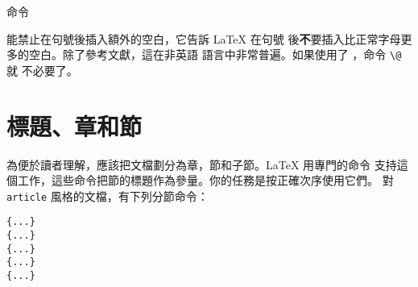 命令
\begin{lscommand}
\end{lscommand}
\noindent 能禁止在句號後插入額外的空白，它告訴 \LaTeX{} 在句號
後{\textbf 不}要插入比正常字母更多的空白。除了參考文獻，這在非英語
語言中非常普遍。如果使用了 ，命令 \verb|\@| 就
不必要了。
\section{標題、章和節}

為便於讀者理解，應該把文檔劃分為章，節和子節。\LaTeX{} 用專門的命令
支持這個工作，這些命令把節的標題作為參量。你的任務是按正確次序使用它們。
對 \texttt{article} 風格的文檔，有下列分節命令：
 \nopagebreak
\begin{lscommand}
\verb|{...}|\\
\verb|{...}|\\
\verb|{...}|\\
\verb|{...}|\\
\verb|{...}|
\end{lscommand}

